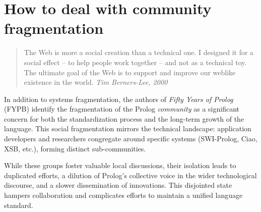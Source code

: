 %


\section{How to deal with community fragmentation}

\begin{quotation}
\noindent The Web is more a social creation than a technical one. I designed it for a social effect -- to help people work together -- and not as a technical toy. The ultimate goal of the Web is to support and improve our weblike existence in the world.
\vspace{-0.3cm}
\flushright \textit{Tim Berners-Lee, 2000}
\vspace{0.1cm}
\end{quotation}

\noindent In addition to systems fragmentation, the authors of \textit{Fifty Years of Prolog} (FYPB) identify the fragmentation of the Prolog \textit{community} as a significant concern for both the standardization process and the long-term growth of the language. This social fragmentation mirrors the technical landscape: application developers and researchers congregate around specific systems (SWI-Prolog, Ciao, XSB, etc.), forming distinct sub-communities.

While these groups foster valuable local discussions, their isolation leads to duplicated efforts, a dilution of Prolog's collective voice in the wider technological discourse, and a slower dissemination of innovations. This disjointed state hampers collaboration and complicates efforts to maintain a unified language standard.

